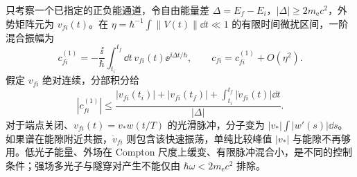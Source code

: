 \begin{exbox}[正负能隙与有限脉冲的混合振幅]
只考察一个已指定的正负能通道，令自由能量差 $\Delta=E_f-E_i$，$|\Delta|\ge2m_{\mathrm e}c^2$，外势矩阵元为 $v_{fi}(t)$。在 $\eta=\hbar^{-1}\int\|V(t)\|\dd t\ll1$ 的有限时间微扰区间，一阶混合振幅为
\begin{equation*}
 c_{fi}^{(1)}=-\frac{\ii}{\hbar}\int_{t_i}^{t_f}\dd t\,
 v_{fi}(t)\ee^{\ii\Delta t/\hbar},
 \qquad c_{fi}=c_{fi}^{(1)}+O(\eta^2).
\end{equation*}
假定 $v_{fi}$ 绝对连续，分部积分给
\begin{equation*}
 |c_{fi}^{(1)}|\le
 \frac{|v_{fi}(t_i)|+|v_{fi}(t_f)|
 +\int_{t_i}^{t_f}|\dot v_{fi}(t)|\dd t}{|\Delta|}.
\end{equation*}
对于端点关闭、$v_{fi}(t)=v_*w(t/T)$ 的光滑脉冲，分子变为 $|v_*|\int|w'(s)|\dd s$。如果谱在能隙附近共振，$\dot v_{fi}$ 则包含该快速振荡，单纯比较峰值 $|v_*|$ 与能隙不再够用。低光子能量、外场在 Compton 尺度上缓变、有限脉冲混合小，是不同的控制条件；强场多光子与隧穿对产生不能仅由 $\hbar\omega<2m_{\mathrm e}c^2$ 排除。
\end{exbox}
